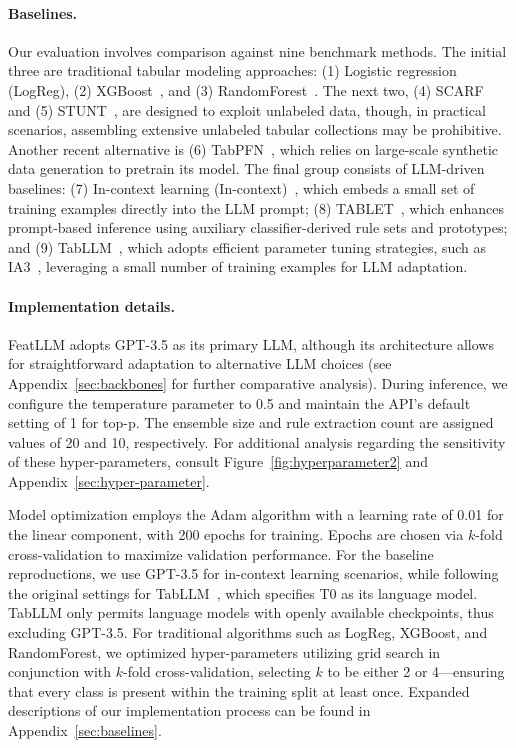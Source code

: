 \vspace*{-0.12in}
\paragraph{Baselines.}
Our evaluation involves comparison against nine benchmark methods. The initial three are traditional tabular modeling approaches: (1) Logistic regression (LogReg), (2) XGBoost~\cite{chen2016xgboost}, and (3) RandomForest~\cite{ho1995random}. The next two, (4) SCARF~\cite{bahri2022scarf} and (5) STUNT~\cite{nam2023stunt}, are designed to exploit unlabeled data, though, in practical scenarios, assembling extensive unlabeled tabular collections may be prohibitive. Another recent alternative is (6) TabPFN~\cite{hollmann2022tabpfn}, which relies on large-scale synthetic data generation to pretrain its model. The final group consists of LLM-driven baselines: (7) In-context learning (In-context)~\cite{wei2022emergent}, which embeds a small set of training examples directly into the LLM prompt; (8) TABLET~\cite{slack2023tablet}, which enhances prompt-based inference using auxiliary classifier-derived rule sets and prototypes; and (9) TabLLM~\cite{hegselmann2023tabllm}, which adopts efficient parameter tuning strategies, such as IA3~\cite{liu2022few}, leveraging a small number of training examples for LLM adaptation.

\vspace*{-0.12in}
\paragraph{Implementation details.}
\textsf{FeatLLM} adopts GPT-3.5 as its primary LLM, although its architecture allows for straightforward adaptation to alternative LLM choices (see Appendix~\ref{sec:backbones} for further comparative analysis). During inference, we configure the temperature parameter to 0.5 and maintain the API's default setting of 1 for top-p. The ensemble size and rule extraction count are assigned values of 20 and 10, respectively. For additional analysis regarding the sensitivity of these hyper-parameters, consult Figure~\ref{fig:hyperparameter2} and Appendix~\ref{sec:hyper-parameter}.

Model optimization employs the Adam algorithm with a learning rate of 0.01 for the linear component, with 200 epochs for training. Epochs are chosen via $k$-fold cross-validation to maximize validation performance. For the baseline reproductions, we use GPT-3.5 for in-context learning scenarios, while following the original settings for TabLLM~\cite{sanh2022multitask}, which specifies T0 as its language model. TabLLM only permits language models with openly available checkpoints, thus excluding GPT-3.5. For traditional algorithms such as LogReg, XGBoost, and RandomForest, we optimized hyper-parameters utilizing grid search in conjunction with $k$-fold cross-validation, selecting $k$ to be either 2 or 4—ensuring that every class is present within the training split at least once. Expanded descriptions of our implementation process can be found in Appendix~\ref{sec:baselines}.

